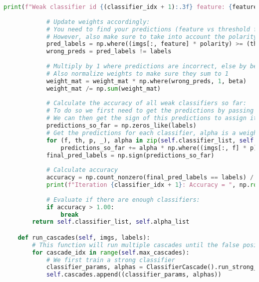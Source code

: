 \documentclass{article}
\begin{document}
\begin{lstlisting}[language=Python]
            print(f"Weak classifier id {(classifier_idx + 1):.3f} feature: {feature:.3f}, threshold: {threshold:.3f}, polarity: {polarity:.3f}, error: {error:.3f}, alpha: {alpha:.3f}")
            
            # Update weights accordingly:
            # You need to find your predictions (feature vs threshold feature value)
            # However, also make sure to take into account the polarity
            pred_labels = np.where((imgs[:, feature] * polarity) >= (threshold * polarity), 1, -1)
            wrong_preds = pred_labels != labels
            
            # Multiply by 1 where predictions are incorrect, else by beta.
            # Also normalize weights to make sure they sum to 1
            weight_mat = weight_mat * np.where(wrong_preds, 1, beta)
            weight_mat /= np.sum(weight_mat)
            
            # Calculate the accuracy of all weak classifiers so far:
            # To do so we first need to get the predictions by passing the input through all the weak classifiers
            # We can then get the sign of this predictions to assign it to a class label (1 or -1)
            predictions_so_far = np.zeros_like(labels)
            # Get the predictions for each classifier, alpha is a weight factor for how much each classifier contributes
            for (f, th, p, _), alpha in zip(self.classifier_list, self.alpha_list):
                predictions_so_far += alpha * np.where((imgs[:, f] * p) >= (th * p), 1, -1)
            final_pred_labels = np.sign(predictions_so_far)
            
            # Calculate accuracy
            accuracy = np.count_nonzero(final_pred_labels == labels) / len(final_pred_labels)
            print(f"Iteration {classifier_idx + 1}: Accuracy = ", np.round(accuracy, 3))
            
            # Evaluate if there are enough classifiers:
            if accuracy > 1.00:
                break
        return self.classifier_list, self.alpha_list

    def run_cascades(self, imgs, labels):
        # This function will run multiple cascades until the false positive rate reaches 0
        for cascade_idx in range(self.max_cascades):
            # We first train a strong classifier
            classifier_params, alphas = ClassifierCascade().run_strong_classifier(imgs, labels)
            self.cascades.append((classifier_params, alphas))
            

\end{lstlisting}
\end{document}

